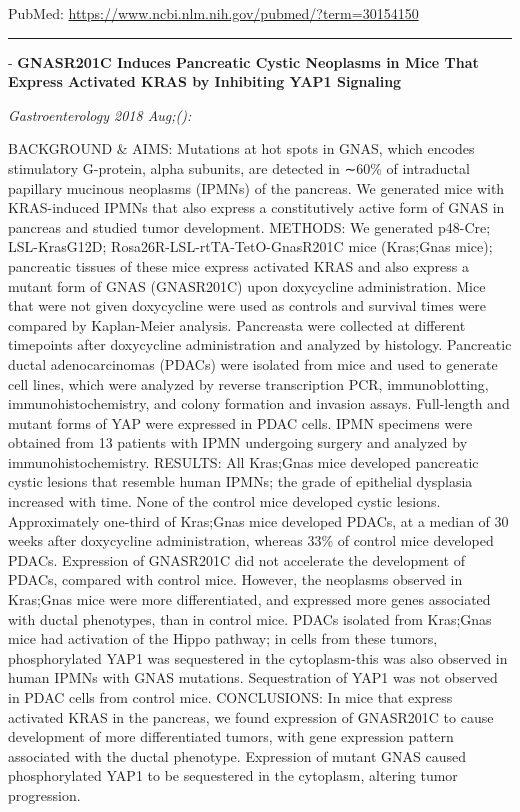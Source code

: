 \documentclass[]{article}
\begin{document}
PubMed: \url{https://www.ncbi.nlm.nih.gov/pubmed/?term=30154150}

{}

{}

\begin{center}\rule{0.5\linewidth}{\linethickness}\end{center}

 - \textbf{GNASR201C Induces Pancreatic Cystic Neoplasms in Mice That
Express Activated KRAS by Inhibiting YAP1 Signaling}

\emph{Gastroenterology 2018 Aug;():}

BACKGROUND \& AIMS: Mutations at hot spots in GNAS, which encodes
stimulatory G-protein, alpha subunits, are detected in ∼60\% of
intraductal papillary mucinous neoplasms (IPMNs) of the pancreas. We
generated mice with KRAS-induced IPMNs that also express a
constitutively active form of GNAS in pancreas and studied tumor
development. METHODS: We generated p48-Cre; LSL-KrasG12D;
Rosa26R-LSL-rtTA-TetO-GnasR201C mice (Kras;Gnas mice); pancreatic
tissues of these mice express activated KRAS and also express a mutant
form of GNAS (GNASR201C) upon doxycycline administration. Mice that were
not given doxycycline were used as controls and survival times were
compared by Kaplan-Meier analysis. Pancreasta were collected at
different timepoints after doxycycline administration and analyzed by
histology. Pancreatic ductal adenocarcinomas (PDACs) were isolated from
mice and used to generate cell lines, which were analyzed by reverse
transcription PCR, immunoblotting, immunohistochemistry, and colony
formation and invasion assays. Full-length and mutant forms of YAP were
expressed in PDAC cells. IPMN specimens were obtained from 13 patients
with IPMN undergoing surgery and analyzed by immunohistochemistry.
RESULTS: All Kras;Gnas mice developed pancreatic cystic lesions that
resemble human IPMNs; the grade of epithelial dysplasia increased with
time. None of the control mice developed cystic lesions. Approximately
one-third of Kras;Gnas mice developed PDACs, at a median of 30 weeks
after doxycycline administration, whereas 33\% of control mice developed
PDACs. Expression of GNASR201C did not accelerate the development of
PDACs, compared with control mice. However, the neoplasms observed in
Kras;Gnas mice were more differentiated, and expressed more genes
associated with ductal phenotypes, than in control mice. PDACs isolated
from Kras;Gnas mice had activation of the Hippo pathway; in cells from
these tumors, phosphorylated YAP1 was sequestered in the cytoplasm-this
was also observed in human IPMNs with GNAS mutations. Sequestration of
YAP1 was not observed in PDAC cells from control mice. CONCLUSIONS: In
mice that express activated KRAS in the pancreas, we found expression of
GNASR201C to cause development of more differentiated tumors, with gene
expression pattern associated with the ductal phenotype. Expression of
mutant GNAS caused phosphorylated YAP1 to be sequestered in the
cytoplasm, altering tumor progression.
\end{document}
